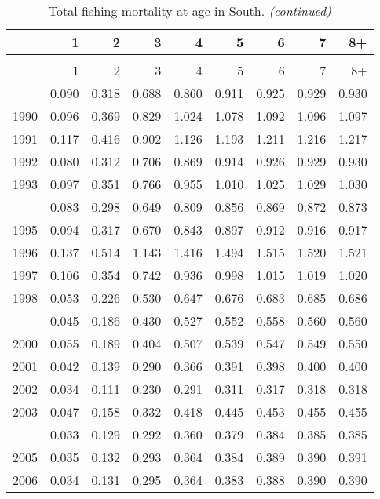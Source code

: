 \documentclass[
]{article}
\begin{document}
\begin{longtable}[t]{lrrrrrrrr}
\caption{\label{tab:South-region-FAA-table}Total fishing mortality at age in South.}\\
\toprule
  & 1 & 2 & 3 & 4 & 5 & 6 & 7 & 8+\\
\midrule
\endfirsthead
\caption[]{Total fishing mortality at age in South. \textit{(continued)}}\\
\toprule
  & 1 & 2 & 3 & 4 & 5 & 6 & 7 & 8+\\
\midrule
\endhead

\endfoot
\bottomrule
\endlastfoot
1989 & 0.090 & 0.318 & 0.688 & 0.860 & 0.911 & 0.925 & 0.929 & 0.930\\
1990 & 0.096 & 0.369 & 0.829 & 1.024 & 1.078 & 1.092 & 1.096 & 1.097\\
1991 & 0.117 & 0.416 & 0.902 & 1.126 & 1.193 & 1.211 & 1.216 & 1.217\\
1992 & 0.080 & 0.312 & 0.706 & 0.869 & 0.914 & 0.926 & 0.929 & 0.930\\
1993 & 0.097 & 0.351 & 0.766 & 0.955 & 1.010 & 1.025 & 1.029 & 1.030\\
\addlinespace
1994 & 0.083 & 0.298 & 0.649 & 0.809 & 0.856 & 0.869 & 0.872 & 0.873\\
1995 & 0.094 & 0.317 & 0.670 & 0.843 & 0.897 & 0.912 & 0.916 & 0.917\\
1996 & 0.137 & 0.514 & 1.143 & 1.416 & 1.494 & 1.515 & 1.520 & 1.521\\
1997 & 0.106 & 0.354 & 0.742 & 0.936 & 0.998 & 1.015 & 1.019 & 1.020\\
1998 & 0.053 & 0.226 & 0.530 & 0.647 & 0.676 & 0.683 & 0.685 & 0.686\\
\addlinespace
1999 & 0.045 & 0.186 & 0.430 & 0.527 & 0.552 & 0.558 & 0.560 & 0.560\\
2000 & 0.055 & 0.189 & 0.404 & 0.507 & 0.539 & 0.547 & 0.549 & 0.550\\
2001 & 0.042 & 0.139 & 0.290 & 0.366 & 0.391 & 0.398 & 0.400 & 0.400\\
2002 & 0.034 & 0.111 & 0.230 & 0.291 & 0.311 & 0.317 & 0.318 & 0.318\\
2003 & 0.047 & 0.158 & 0.332 & 0.418 & 0.445 & 0.453 & 0.455 & 0.455\\
\addlinespace
2004 & 0.033 & 0.129 & 0.292 & 0.360 & 0.379 & 0.384 & 0.385 & 0.385\\
2005 & 0.035 & 0.132 & 0.293 & 0.364 & 0.384 & 0.389 & 0.390 & 0.391\\
2006 & 0.034 & 0.131 & 0.295 & 0.364 & 0.383 & 0.388 & 0.390 & 0.390\\

\end{longtable}
\end{document}
